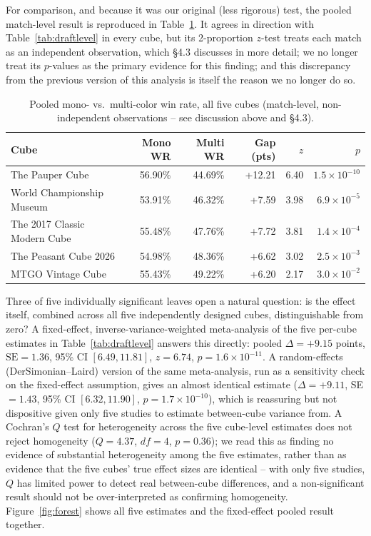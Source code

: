 \documentclass[11pt]{article}
\begin{document}
For comparison, and because it was our original (less rigorous) test, the pooled
match-level result is reproduced in Table~\ref{tab:monogap}. It agrees in
direction with Table~\ref{tab:draftlevel} in every cube, but its 2-proportion
$z$-test treats each match as an independent observation, which \S4.3 discusses
in more detail; we no longer treat its $p$-values as the primary evidence for
this finding; and this discrepancy from the previous version of this analysis
is itself the reason we no longer do so.

\begin{table}[h]
\centering
\caption{Pooled mono- vs.\ multi-color win rate, all five cubes (match-level,
non-independent observations -- see discussion above and \S4.3).}
\label{tab:monogap}
\small
\begin{tabular}{lrrrrr}
\toprule
Cube & Mono WR & Multi WR & Gap (pts) & $z$ & $p$ \\
\midrule
The Pauper Cube & 56.90\% & 44.69\% & +12.21 & 6.40 & $1.5\times10^{-10}$ \\
World Championship Museum & 53.91\% & 46.32\% & +7.59 & 3.98 & $6.9\times10^{-5}$ \\
The 2017 Classic Modern Cube & 55.48\% & 47.76\% & +7.72 & 3.81 & $1.4\times10^{-4}$ \\
The Peasant Cube 2026 & 54.98\% & 48.36\% & +6.62 & 3.02 & $2.5\times10^{-3}$ \\
MTGO Vintage Cube & 55.43\% & 49.22\% & +6.20 & 2.17 & $3.0\times10^{-2}$ \\
\bottomrule
\end{tabular}
\end{table}

Three of five individually significant leaves open a natural question: is the
effect itself, combined across all five independently designed cubes,
distinguishable from zero? A fixed-effect, inverse-variance-weighted
meta-analysis of the five per-cube estimates in Table~\ref{tab:draftlevel}
answers this directly: pooled $\Delta = +9.15$ points, $\text{SE}=1.36$, 95\% CI
$[6.49, 11.81]$, $z=6.74$, $p=1.6\times10^{-11}$. A random-effects
(DerSimonian--Laird) version of the same meta-analysis, run as a sensitivity
check on the fixed-effect assumption, gives an almost identical estimate
($\Delta=+9.11$, SE$=1.43$, 95\% CI $[6.32, 11.90]$, $p=1.7\times10^{-10}$),
which is reassuring but not dispositive given only five studies to estimate
between-cube variance from. A Cochran's $Q$ test for heterogeneity across the
five cube-level estimates does not reject homogeneity ($Q=4.37$, $df=4$,
$p=0.36$); we read this as finding no evidence of substantial heterogeneity
among the five estimates, rather than as evidence that the five cubes' true
effect sizes are identical -- with only five studies, $Q$ has limited power to
detect real between-cube differences, and a non-significant result should not
be over-interpreted as confirming homogeneity. Figure~\ref{fig:forest} shows
all five estimates and the fixed-effect pooled result together.
\end{document}
